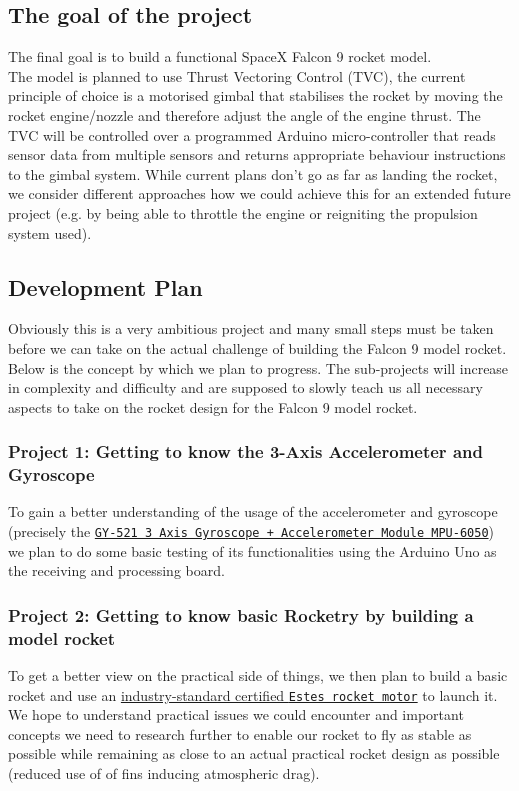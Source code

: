 \documentclass[a4paper,10pt]{article} %
\begin{document}
\subsection{The goal of the project}

The final goal is to build a functional SpaceX Falcon 9 rocket model.\\
The model is planned to use Thrust Vectoring Control (TVC), the current
principle of choice is a motorised gimbal that stabilises the
rocket by moving the rocket engine/nozzle and therefore adjust the angle
of the engine thrust. The TVC will be controlled over a programmed
Arduino micro-controller that reads sensor data from multiple sensors
and returns appropriate behaviour instructions to the gimbal system.
While current plans don't go as far as landing the rocket, we consider
different approaches how we could achieve this for an extended future project (e.g. by being able to
throttle the engine or reigniting the propulsion system used).

\subsection{Development Plan}

Obviously this is a very ambitious project and many small steps must be
taken before we can take on the actual challenge of building the Falcon 9 model rocket. Below is the concept by
which we plan to progress. The sub-projects will increase in complexity and difficulty and are supposed to slowly
teach us all necessary aspects to take on the rocket design for the Falcon 9 model rocket.

\subsubsection*{Project 1: Getting to know the 3-Axis Accelerometer and Gyroscope}
To gain a better understanding of the usage of the accelerometer and
gyroscope (precisely the \href{https://playground.arduino.cc/Main/MPU-6050}{\texttt{GY-521 3 Axis
Gyroscope + Accelerometer Module MPU-6050}}) we plan to do some basic
testing of its functionalities using the Arduino Uno as the receiving
and processing board.

\subsubsection*{Project 2: Getting to know basic Rocketry by building a model rocket}
To get a better view on the practical side of things, we then plan to build a
basic rocket and use an \href{https://www.estesrockets.com/rockets/engines}{industry-standard
certified \texttt{Estes rocket motor}} to launch it. We hope to understand
practical issues we could encounter and important concepts we need to
research further to enable our rocket to fly as stable as possible while
remaining as close to an actual practical rocket design as possible (reduced use of of fins
inducing atmospheric drag).
\end{document}
